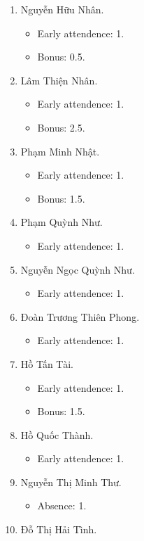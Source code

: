 \documentclass{article}
\begin{document}
\begin{enumerate}
\begin{itemize}
	\end{itemize}
	\item {\sc Nguyễn Hữu Nhân.}
	\begin{itemize}
		\item Early attendence: 1.
		\item Bonus: 0.5.
	\end{itemize}
	\item {\sc Lâm Thiện Nhân.}
	\begin{itemize}
		\item Early attendence: 1.
		\item Bonus: 2.5.
	\end{itemize}
	\item {\sc Phạm Minh Nhật.}
	\begin{itemize}
		\item Early attendence: 1.
		\item Bonus: 1.5.
	\end{itemize}
	\item {\sc Phạm Quỳnh Như.}
	\begin{itemize}
		\item Early attendence: 1.
	\end{itemize}
	\item {\sc Nguyễn Ngọc Quỳnh Như.}
	\begin{itemize}
		\item Early attendence: 1.
	\end{itemize}
	\item {\sc Đoàn Trương Thiên Phong.}
	\begin{itemize}
		\item Early attendence: 1.
	\end{itemize}
	\item {\sc Hồ Tấn Tài.}
	\begin{itemize}
		\item Early attendence: 1.
		\item Bonus: 1.5.
	\end{itemize}
	\item {\sc Hồ Quốc Thành.}
	\begin{itemize}
		\item Early attendence: 1.
	\end{itemize}
	\item {\sc Nguyễn Thị Minh Thư.}
	\begin{itemize}
		\item Absence: 1.
	\end{itemize}
	\item {\sc Đỗ Thị Hải Tình.}

\end{enumerate}
\end{document}
